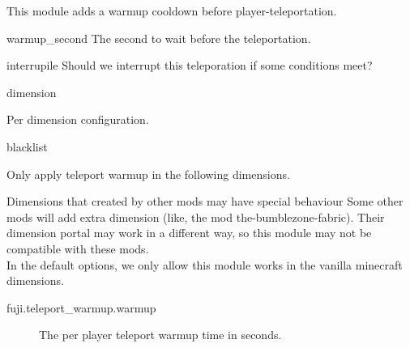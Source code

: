 \label{ch:teleport_warmup}

This module adds a warmup cooldown before player-teleportation.

\begin{Configuration}
    \item[warmup\_second]{
        The second to wait before the teleportation.
    }

    \item[interrupile]{
        Should we interrupt this teleporation if some conditions meet?
    }

    \item[dimension]{
        Per dimension configuration.

        \begin{NestedList}
            \item[blacklist] {
                Only apply teleport warmup in the following dimensions.

                \begin{warn}{Dimensions that created by other mods may have special behaviour}
                    Some other mods will add extra dimension (like, the mod the-bumblezone-fabric).
                    Their dimension portal may work in a different way, so this module may not be compatible with these mods.\\
                    In the default options, we only allow this module works in the vanilla minecraft dimensions.
                \end{warn}
            }
        \end{NestedList}
    }
\end{Configuration}

\begin{description}
    \item [fuji.teleport_warmup.warmup] The per player teleport warmup time in seconds.
\end{description}
